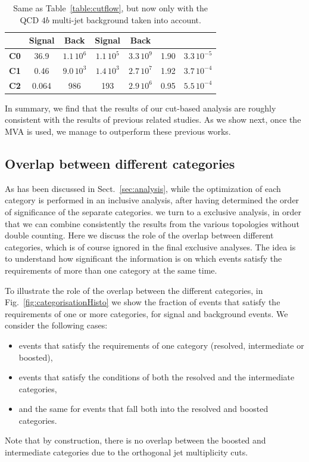 \begin{table}[t]
\begin{tabular}{c|c|c|c|c|c|c}
      &    Signal & Back   &  Signal  & Back
    &   & \\
    \hline
 {\bf C0}  &  36.9  & $1.1\,10^{6}$ & $1.1\,10^5$ & $3.3\,10^{9}$  &  1.90 & $3.3\,10^{-5}$\\
        {\bf C1}  &  0.46    & $9.0\,10^3$    &  $1.4\,10^3$   & $2.7\,10^7$     & 1.92     &  $3.7\,10^{-4}$ \\
        {\bf C2}  &  0.064     &  986     &  193   &  $2.9\,10^6$    &  0.95  &  $5.5\,10^{-4}$ \\
        \hline
  \end{tabular}
  \caption{\small Same as Table~\ref{table:cutflow}, but now
    only with the QCD $4b$ multi-jet background taken into account.
    \label{table:cutflow4B}
  }
\end{table}


In summary, we find that the results of our cut-based analysis are roughly
consistent with the results of previous related studies.
%
As we show next, once the MVA is used, we manage to outperform these previous
works.


\subsection{Overlap between different categories}
\label{sec:overlap}

As has been discussed in Sect.~\ref{sec:analysis}, while the optimization of each
category is performed in an inclusive analysis, after having determined the order
of significance of the separate categories. we turn to a exclusive analysis,
in order that
we can combine consistently the results from the various topologies without double
counting.
%
Here we discuss the role of the overlap
between  different categories, which is of course ignored in the final exclusive
analyses.
%
The idea is to understand how significant the information is on which events satisfy the requirements
of more than one category at the same time.

To illustrate the role of the overlap between the different categories, in
Fig.~\ref{fig:categorisationHisto} we show the fraction of events that satisfy the requirements
of one or more categories, for signal and background events.
%
We consider the following cases:
\begin{itemize}
\item events that satisfy the requirements of one category (resolved,
  intermediate or boosted),
\item events that satisfy the conditions of both the resolved and the intermediate categories,
\item and the same for events that fall both
  into the resolved and boosted categories.
\end{itemize}
 Note that by construction, there is no overlap between the boosted
  and intermediate categories due to the
 orthogonal jet multiplicity cuts.

